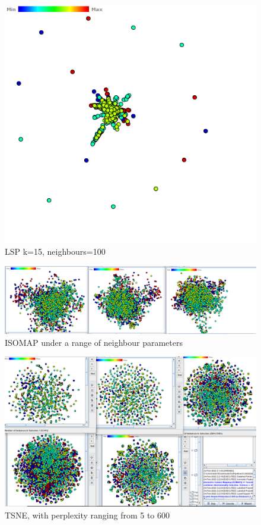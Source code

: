 \documentclass[ 10pt ]{fphw}
\begin{document}
\begin{center}
\begin{figure}[H]
    \centering
	\includegraphics[width=0.65\columnwidth]{task2c/reutersK15N100.PNG}
	\caption{LSP k=15, neighbours=100}
	\label{fig:reutlsp15.100}
	\end{figure}
\end{center}


\begin{center}
\begin{figure}[H]
    \centering
	\includegraphics[width=0.65\columnwidth]{task2c/reutersISOMAP.PNG}
	\caption{ISOMAP under a range of neighbour parameters}
	\label{fig:reutisomap}
	\end{figure}
\end{center}

\begin{center}
\begin{figure}[H]
    \centering
	\includegraphics[width=0.65\columnwidth]{task2c/reutersTSNE.PNG}
	\caption{TSNE, with perplexity ranging from 5 to 600}
	\label{fig:reuttsneCOS}
	\end{figure}
\end{center}
\end{document}
